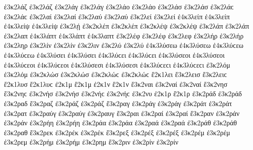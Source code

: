{ἐ3κ2λάζ ἐ3κ2λάζ   %
ἐ3κ2λάγ ἐ3κ2λάγ   %
ἐ3κ2λάο ἐ3κ2λάο   %
ἐ3κ2λάσ ἐ3κ2λάσ ἐ3κ2λάϲ ἐ3κ2λάϲ   %
ἐ3κ2λαί ἐ3κ2λαί   %
ἐ3κ2λαύ ἐ3κ2λαύ   %
ἐ3κ2λεί ἐ3κ2λεί   %
ἐ4κ3λείπ ἐ4κ3λείπ   %
ἐ4κ3λείψ ἐ4κ3λείψ   %
ἐ3κ2λῄ   %
ἐ3κ2κλέπ ἐ3κ2κλέπ   %
ἐ3κ2κλέψ ἐ3κ2κλέψ   %
ἐ3κ2λάπ ἐ3κ2λάπ   %
ἐ3κ2λαπ   %
ἐ4κ3λάπτ ἐ4κ3λάπτ   %
ἐ4κ3λαπτ
ἐ3κ2λέφ ἐ3κ2λέφ   %
ἐ3κ2λεφ   %
ἐ3κ2λήρ ἐ3κ2λήρ   %
ἐ3κ2ληρ   %
ἐ3κ2λίν ἐ3κ2λίν   %
ἐ3κ2λιν   %
ἐ3κ2λύ ἐ3κ2λύ   %
ἐ4κ3λύσεω ἐ4κ3λύσεω ἐ4κ3λύϲεω ἐ4κ3λύϲεω   %
ἐ4κ3λύσει ἐ4κ3λύσει ἐ4κ3λύϲει ἐ4κ3λύϲει
ἐ4κ3λύσεοι ἐ4κ3λύσεοι ἐ4κ3λύϲεοι ἐ4κ3λύϲεοι
ἐ4κ3λύσεσι ἐ4κ3λύσεσι ἐ4κ3λύϲεϲι ἐ4κ3λύϲεϲι
ἐ3κ2λόμ ἐ3κ2λόμ   %
ἐ3κ2κλώσ ἐ3κ2κλώσ ἐ3κ2κλώϲ ἐ3κ2κλώϲ   %
ἔ2κ1λει   %
ἔ3κ2λεισ ἔ3κ2λειϲ   %
ἔ2κ1λυσ ἔ2κ1λυϲ   %
ἐ2κ1μ
ἔ2κ1μ
ἐ2κ1ν
ἔ2κ1ν
ἔ3κ2ναι   %
ἐ3κ2ναί ἐ3κ2ναί   %
ἔ3κ2νησ ἔ3κ2νηϲ   %
ἐ3κ2νήσ ἐ3κ2νήσ ἐ3κ2νήϲ ἐ3κ2νήϲ   %
ἐ3κ2νυ   %
ἐ2κ1ρ
ἔ2κ1ρ
ἐ3κ2ράδ ἐ3κ2ράδ   %
ἐ3κ2ραδ
ἔ3κ2ραζ   %
ἐ3κ2ράζ ἐ3κ2ράζ
ἔ3κ2ραγ   %
ἐ3κ2ράγ ἐ3κ2ράγ
ἐ3κ2ράτ ἐ3κ2ράτ   %
ἐ3κ2ρατ
ἐ3κ2ραύγ ἐ3κ2ραύγ   %
ἐ3κ2ραυγ
ἔ3κ2ραι   %
ἐ3κ2ραί ἐ3κ2ραί
ἔ3κ2ραν   %
ἐ3κ2ράν ἐ3κ2ράν
ἐ3κ2ρήη ἐ3κ2ρήη   %
ἐ3κ2ράα ἐ3κ2ράα
ἐ3κ2ραά ἐ3κ2ραά
ἐ3κ2ράθ ἐ3κ2ράθ   %
ἐ3κ2ραθ
ἔ3κ2ρεκ   %
ἐ3κ2ρέκ ἐ3κ2ρέκ
ἔ3κ2ρεξ   %
ἐ3κ2ρέξ ἐ3κ2ρέξ
ἐ3κ2ρέμ ἐ3κ2ρέμ   %
ἐ3κ2ρεμ
ἐ3κ2ρήμ ἐ3κ2ρήμ   %
ἐ3κ2ρημ
ἔ3κ2ριν   %
ἐ3κ2ρίν ἐ3κ2ρίν
}
